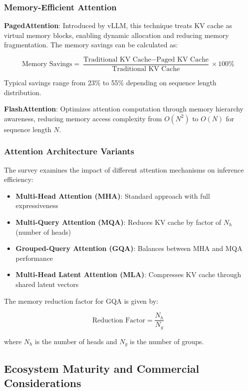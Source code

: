 \documentclass[12pt,a4paper]{article}
\begin{document}
\subsubsection{Memory-Efficient Attention}

\textbf{PagedAttention}: Introduced by vLLM, this technique treats KV cache as virtual memory blocks, enabling dynamic allocation and reducing memory fragmentation. The memory savings can be calculated as:

\begin{equation}
\text{Memory Savings} = \frac{\text{Traditional KV Cache} - \text{Paged KV Cache}}{\text{Traditional KV Cache}} \times 100\%
\end{equation}

Typical savings range from 23\% to 55\% depending on sequence length distribution.

\textbf{FlashAttention}: Optimizes attention computation through memory hierarchy awareness, reducing memory access complexity from $O(N^2)$ to $O(N)$ for sequence length $N$.

\subsubsection{Attention Architecture Variants}

The survey examines the impact of different attention mechanisms on inference efficiency:

\begin{itemize}
    \item \textbf{Multi-Head Attention (MHA)}: Standard approach with full expressiveness
    \item \textbf{Multi-Query Attention (MQA)}: Reduces KV cache by factor of $N_h$ (number of heads)
    \item \textbf{Grouped-Query Attention (GQA)}: Balances between MHA and MQA performance
    \item \textbf{Multi-Head Latent Attention (MLA)}: Compresses KV cache through shared latent vectors
\end{itemize}

The memory reduction factor for GQA is given by:

\begin{equation}
\text{Reduction Factor} = \frac{N_h}{N_g}
\end{equation}

where $N_h$ is the number of heads and $N_g$ is the number of groups.

\subsection{Ecosystem Maturity and Commercial Considerations}
\end{document}
